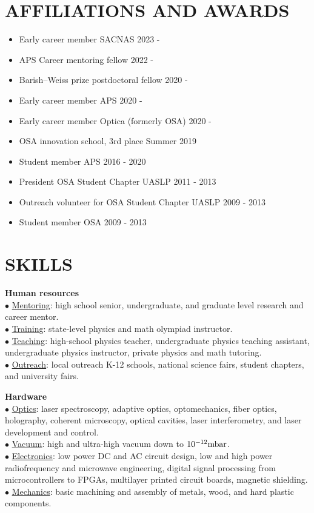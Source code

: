 \documentclass[margin]{res} %
\begin{document}
\begin{resume}
\section{AFFILIATIONS AND AWARDS}
 
\begin{itemize}
    \item{Early career member SACNAS \hfill 2023 -}
    \item{APS Career mentoring fellow \hfill 2022 -}
    \item{Barish--Weiss prize postdoctoral fellow \hfill 2020 -}
    \item{Early career member APS \hfill 2020 -}
    \item{Early career member Optica (formerly OSA) \hfill 2020 -}
    \item{OSA innovation school, 3rd place \hfill Summer 2019}
    \item{Student member APS \hfill 2016 - 2020}
    \item{President OSA Student Chapter UASLP \hfill 2011 - 2013}
    \item{Outreach volunteer for OSA Student Chapter UASLP \hfill 2009 - 2013}
    \item{Student member OSA \hfill 2009 - 2013}
\end{itemize}

\section{SKILLS}

{\bf Human resources}\\
$\bullet$ \underline{Mentoring}: high school senior, undergraduate, and graduate level research and career mentor.\\
$\bullet$ \underline{Training}: state-level physics and math olympiad instructor.\\
$\bullet$ \underline{Teaching}: high-school physics teacher, undergraduate physics teaching assistant, undergraduate physics instructor, private physics and math tutoring.\\
$\bullet$ \underline{Outreach}: local outreach K-12 schools, national science fairs, student chapters, and university fairs.

{\bf Hardware}\\
$\bullet$ \underline{Optics}: laser spectroscopy, adaptive optics, optomechanics, fiber optics, holography, coherent microscopy, optical cavities, laser interferometry, and laser development and control.\\
$\bullet$ \underline{Vacuum}: high and ultra-high vacuum down to ${10^{-12} {\rm mbar}}$.\\
$\bullet$ \underline{Electronics}: low power DC and AC circuit design, low and high power radiofrequency and microwave engineering, digital signal processing from microcontrollers to FPGAs, multilayer printed circuit boards, magnetic shielding.\\
$\bullet$ \underline{Mechanics}: basic machining and assembly of metals, wood, and hard plastic components.


\end{resume}
\end{document}
